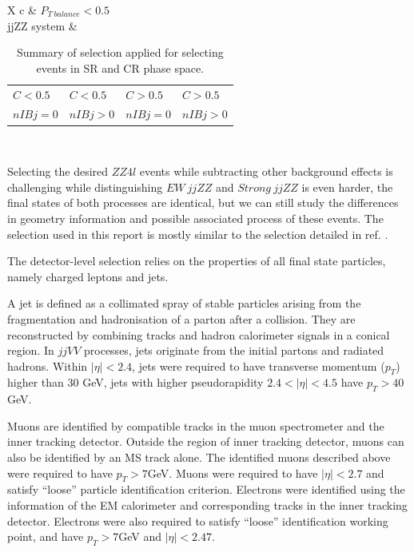 \documentclass[12pt]{article}
\begin{document}
\begin{table}[ht!]
\begin{tabularx}{\textwidth}{X c}
            \hline
             &  $P_{T\ balance} < 0.5$\\
            jjZZ system & \begin{tabular}{p{2cm}  p{2cm}  p{2cm}  p{2cm}} $C < 0.5$ & $C < 0.5$ & $C > 0.5$ & $C > 0.5$ \\ $nIBj = 0$ & $nIBj > 0$ & $nIBj = 0$ & $nIBj > 0$\end{tabular}\\
            \hline\hline
            \end{tabularx}
            \caption{Summary of selection applied for selecting events in SR and CR phase space.}
            \label{selectioncut}
        \end{table}
        \par Selecting the desired $ZZ4l$ events while subtracting other background effects is challenging while distinguishing 
        $EW\ jjZZ$ and $Strong\ jjZZ$ is even harder, the final states of both processes are identical, but we can still study 
        the differences in geometry information and possible associated process of these events. The selection used in this 
        report is mostly similar to the selection detailed in ref. \cite{ATLAS-CONF-2019-033}.
        \par The detector-level selection relies on the properties of all final state particles, namely charged leptons and jets.  
        \par A jet is defined as a collimated spray of stable particles arising from the fragmentation and hadronisation of a 
        parton after a collision\cite{Atkin_2015}. They are reconstructed by combining tracks and hadron calorimeter signals in a conical region.
        In $jjVV$ processes, jets originate from the initial partons and radiated hadrons. 
        Within $|\eta| < 2.4$, jets were required to have transverse momentum 
        ($p_{T}$) higher than 30 GeV, jets with higher pseudorapidity $2.4 < |\eta| < 4.5$ have $p_T > 40$ GeV. 

        \par Muons are identified by compatible tracks in the muon spectrometer and the inner tracking detector. 
        Outside the region of inner tracking detector, muons can also be identified by an MS track alone. 
        The identified muons described above were required to have $p_{T} > 7 $GeV. Muons were required to have 
        $|\eta| < 2.7$  and satisfy ``loose'' particle identification criterion. Electrons were identified using 
        the information of the EM calorimeter and corresponding tracks in the inner tracking detector. Electrons 
        were also required to satisfy ``loose'' identification working point, and have $p_{T} > 7 $GeV and $|\eta| < 2.47$.
\end{document}
